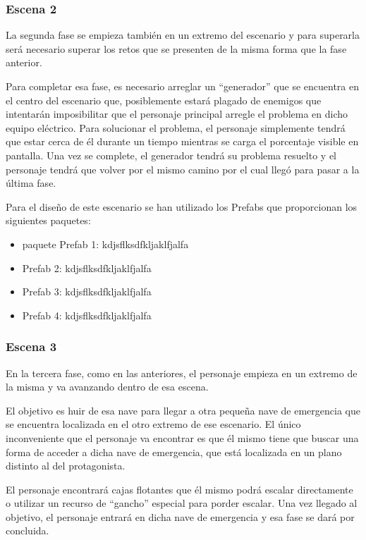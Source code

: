 \subsubsection{Escena 2}
La segunda fase se empieza también en un extremo del escenario y para superarla será necesario superar los retos que se presenten de la misma forma que la fase anterior.

Para completar esa fase, es necesario arreglar un “generador” que se encuentra en el centro del escenario que, posiblemente estará plagado de enemigos que intentarán imposibilitar que el personaje principal arregle el problema en dicho equipo eléctrico. Para solucionar el problema, el personaje simplemente tendrá que estar cerca de él durante un tiempo mientras se carga el porcentaje visible en pantalla. Una vez se complete, el generador tendrá su problema resuelto y el personaje tendrá que volver por el mismo camino por el cual llegó para pasar a la última fase.

Para el diseño de este escenario se han utilizado los Prefabs que proporcionan los siguientes paquetes:
\begin{itemize}
	\item paquete Prefab 1: kdjsflksdfkljaklfjalfa
	\item Prefab 2: kdjsflksdfkljaklfjalfa
	\item Prefab 3: kdjsflksdfkljaklfjalfa
	\item Prefab 4: kdjsflksdfkljaklfjalfa
\end{itemize}

\subsubsection{Escena 3}
En la tercera fase, como en las anteriores, el personaje empieza en un extremo de la misma y va avanzando dentro de esa escena.

El objetivo es huir de esa nave para llegar a otra pequeña nave de emergencia que se encuentra localizada en el otro extremo de ese escenario. El único inconveniente que el personaje va encontrar es que él mismo tiene que buscar una forma de acceder a dicha nave de emergencia, que está localizada en un plano distinto al del protagonista.

El personaje encontrará cajas flotantes que él mismo podrá escalar directamente o utilizar un recurso de ``gancho'' especial para porder escalar. Una vez llegado al objetivo, el personaje entrará en dicha nave de emergencia y esa fase se dará por concluida.

